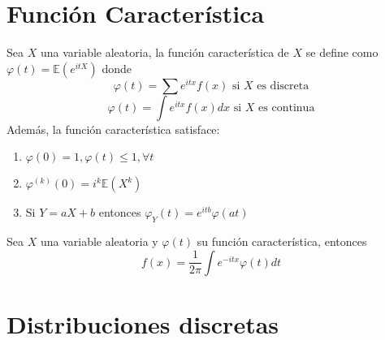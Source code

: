 \begin{ejr}

\end{ejr}

\section{Función Característica}

\begin{defn}
Sea $X$ una variable aleatoria, la función característica de $X$ se define como $\varphi(t) = \mathbb{E}(e^{itX})$ donde \[ \varphi(t) = \sum e^{itx}f(x) \text{ si $X$ es discreta} \] \[ \varphi(t) = \int e^{itx}f(x)dx \text{ si $X$ es continua} \] Además, la función característica satisface:

\begin{enumerate}[label=(\roman*)]
    \item $\varphi(0) = 1, \varphi(t) \leq 1, \forall t $
    \item $\varphi^{(k)}(0) = i^k\mathbb{E}(X^k)$
    \item Si $Y = aX+b$ entonces $\varphi_Y(t)=e^{itb}\varphi(at)$
\end{enumerate}

\end{defn}

\begin{theo}[de inversión]
Sea $X$ una variable aleatoria y $\varphi(t)$ su función característica, entonces \[ f(x) = \frac{1}{2\pi} \int e^{-itx}\varphi(t)dt \]
\end{theo}

\begin{ejr}

\end{ejr}

\begin{ejr}

\end{ejr}

\begin{ejr}

\end{ejr}

\section{Distribuciones discretas}


